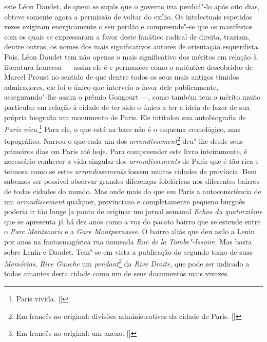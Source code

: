 este Léon Daudet, de quem se supôs que o governo iria perdoá"-lo após
oito dias, obteve somente agora a permissão de voltar do exílio. Os
intelectuais repetidas vezes exigiram energicamente o seu perdão e
compreende"-se que os manifestos com os quais se expressaram a favor
deste fanático radical de direita, traziam, dentre outros, os nomes dos
mais significativos autores de orientação esquerdista. Pois, Léon Daudet
tem não apenas o mais significativo dos méritos em relação à literatura
francesa --- assim ele é e permanece como o autêntico descobridor de
Marcel Proust no sentido de que dentre todos os seus mais antigos
tímidos admiradores, ele foi o único que interveio a favor dele
publicamente, assegurando"-lhe assim o prêmio Gongourt ---, como também
tem o mérito muito particular em relação à cidade de ter sido o único a
ter a ideia de fazer de sua própria biografia um monumento de Paris. Ele
intitulou sua autobiografia de \emph{Paris vécu}.\footnote{Paris
  vivida. []} Para ele, o que está na base não é o esquema cronológico,
mas topográfico. Narrou o que cada um dos
\emph{arrondissement}\footnote{Em francês no original: divisões
  administrativas da cidade de Paris. []} deu"-lhe desde seus primeiros dias
em Paris até hoje. Para compreender este livro inteiramente, é
necessário conhecer a vida singular dos \emph{arrondissements} de Paris
que é tão rica e teimosa como se estes \emph{arrondissements} fossem
muitas cidades de província. Bem sabemos ser possível observar grandes
diferenças folclóricas nos diferentes bairros de todas cidades do mundo.
Mas onde mais do que em Paris a autoconsciência de um
\emph{arrondissement} qualquer, provinciano e completamente pequeno
burguês poderia ir tão longe {[}a ponto de originar um jornal semanal
\emph{Echos du quatorzième} que se apresenta já há dez anos como a voz
do pacato bairro que se estende entre o \emph{Parc Montsouris} e a
\emph{Gare Montparnasse}. O bairro aliás que deu asilo a Lenin por anos
na fantasmagórica rua nomeada \emph{Rue de la Tombe"-Issoire}. Mas basta
sobre Lenin e Daudet. Tem"-se em vista a publicação do segundo tomo de
suas \emph{Memórias}, \emph{Rive Gauche} um \emph{pendant}\footnote{Em francês no original: um anexo. []} da \emph{Rive Droite}, que pode ser
indicado a todos amantes desta cidade como um de seus documentos mais
vivazes.

